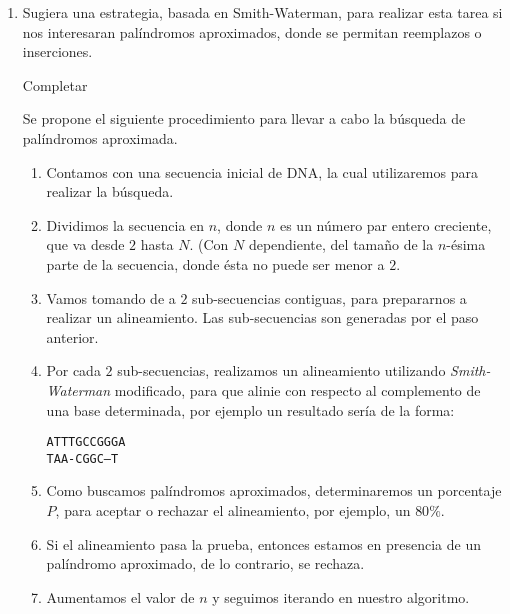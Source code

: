 \begin{enumerate}
	\item Sugiera una estrategia, basada en Smith-Waterman, para realizar esta tarea si nos interesaran
		palíndromos aproximados, donde se permitan reemplazos o inserciones.


			 Completar

			Se propone el siguiente procedimiento para llevar a cabo la búsqueda
			de palíndromos aproximada.

			\begin{enumerate}
				\item Contamos con una secuencia inicial de DNA, la cual utilizaremos
					para realizar la búsqueda.
				\item Dividimos la secuencia en $n$, donde $n$ es un número par entero
					creciente, que va desde $2$ hasta $N$. (Con $N$ dependiente,
					del tamaño de la $n$-ésima parte de la secuencia, donde ésta
					no puede ser menor a $2$.
				\item Vamos tomando de a $2$ sub-secuencias contiguas, para prepararnos
					a realizar un alineamiento. Las sub-secuencias son generadas por el
					paso anterior.
				\item Por cada $2$ sub-secuencias, realizamos un alineamiento utilizando
					\emph{Smith-Waterman} modificado, para que alinie con respecto al
					complemento de una base determinada, por ejemplo un resultado sería
					de la forma:
					\begin{center}	
					\texttt{ATTTGCCGGGA}\\
					\texttt{TAA-CGGC--T}
					\end{center}	
				\item Como buscamos palíndromos aproximados, determinaremos un porcentaje
					$P$, para aceptar o rechazar el alineamiento, por ejemplo, un $80\%$. 
				\item Si el alineamiento pasa la prueba, entonces estamos en presencia
					de un palíndromo aproximado, de lo contrario, se rechaza.
				\item Aumentamos el valor de $n$ y seguimos iterando en nuestro algoritmo.
			\end{enumerate}
			


\end{enumerate}
